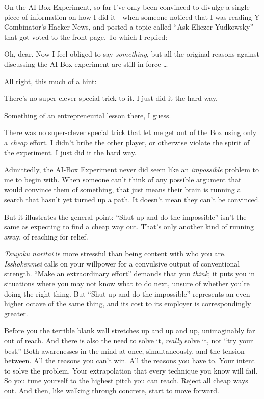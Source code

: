 {
 On the AI-Box Experiment, so far I've only been
convinced to divulge a single piece of information on how I did
it---when someone noticed that I was reading Y
Combinator's Hacker News, and posted a topic called
``Ask Eliezer Yudkowsky'' that got
voted to the front page. To which I replied:}

{
 Oh, dear. Now I feel obliged to say \textit{something}, but all
the original reasons against discussing the AI-Box experiment are still
in force \ldots}

{
 All right, this much of a hint:}

{
 There's no super-clever special trick to it. I
just did it the hard way.}

{
 Something of an entrepreneurial lesson there, I guess.}

{
 There was no super-clever special trick that let me get out of the
Box using only a \textit{cheap} effort. I didn't bribe
the other player, or otherwise violate the spirit of the experiment. I
just did it the hard way.}

{
 Admittedly, the AI-Box Experiment never did seem like an
\textit{impossible} problem to me to begin with. When someone
can't think of any possible argument that would
convince them of something, that just means their brain is running a
search that hasn't yet turned up a path. It
doesn't mean they can't be convinced.}

{
 But it illustrates the general point: ``Shut up
and do the impossible'' isn't the
same as expecting to find a cheap way out. That's only
another kind of running away, of reaching for relief.}

{
 \textit{Tsuyoku naritai} is more stressful than being content with
who you are. \textit{Isshokenmei} calls on your willpower for a
convulsive output of conventional strength. ``Make an
extraordinary effort'' demands that you
\textit{think}; it puts you in situations where you may not know what
to do next, unsure of whether you're doing the right
thing. But ``Shut up and do the
impossible'' represents an even higher octave of the
same thing, and its cost to its employer is correspondingly greater.}

{
 Before you the terrible blank wall stretches up and up and up,
unimaginably far out of reach. And there is also the need to solve it,
\textit{really} solve it, not ``try your
best.'' Both awarenesses in the mind at once,
simultaneously, and the tension between. All the reasons you
can't win. All the reasons you have to. Your intent to
solve the problem. Your extrapolation that every technique you know
will fail. So you tune yourself to the highest pitch you can reach.
Reject all cheap ways out. And then, like walking through concrete,
start to move forward.}

